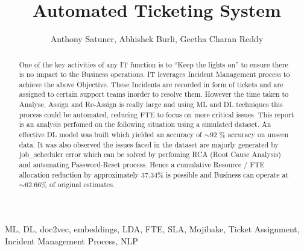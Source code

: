 \documentclass{paper}
\title{Automated Ticketing System}
\author{Anthony Satuner, Abhishek Burli, Geetha Charan Reddy}
\begin{document}
    \maketitle
    \begin{abstract}
        One  of  the  key  activities  of  any  IT  function  is  to  “Keep  the  lights on” to ensure there is no impact to the Business operations. IT leverages Incident Management process to achieve the above Objective. These Incidents are recorded in form of tickets and are assigned to certain support teams inorder to resolve them. However the time taken to Analyse, Assign and Re-Assign is really large and using ML and DL techniques this process could be automated, reducing FTE to focus on more critical issues. This report is an analysis perfomed on the following situation using a simulated dataset. An effective DL model was built which yielded an accuracy of $\sim$92 \% accuracy on unseen data. It was also observed the issues faced in the dataset are majorly generated by job\_scheduler error which can be solved by perfoming RCA (Root Cause Analysis) and automating Password-Reset process. Hence a cumulative  Resource / FTE  allocation  reduction  by  approximately  37.34\% is possible and Business can operate at $\sim$62.66\% of original estimates.
    \end{abstract}
    
    \begin{keywords}
        ML, DL, doc2vec, embeddings, LDA, FTE, SLA, Mojibake, Ticket Assignment, Incident Management Process, NLP
    \end{keywords}

    
    
    
    
    
    

    \nocite{*}
    \newpage
    
    \begin{multicols}{2}
    
    \end{multicols}
\end{document}
